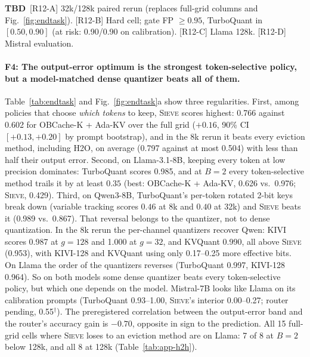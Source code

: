 \documentclass{article}
\newif\ifshowtbd \showtbdtrue
\newcommand{\tbd}[1]{\ifshowtbd{\color{tbdcol}\textbf{TBD}~#1}\else\ifhmode\unskip\fi\fi}
\newcommand{\est}[1]{{\color{estcol}#1$^{\dagger}$}}
\newcommand{\sieve}{\textsc{Sieve}}
\theoremstyle{definition}
\begin{document}
\tbd{[R12-A] 32k/128k paired rerun (replaces full-grid columns and Fig.~\ref{fig:endtask}). [R12-B] Hard cell; gate FP $\ge0.95$, TurboQuant in $[0.50,0.90]$ (at risk: 0.90/0.90 on calibration). [R12-C] Llama 128k. [R12-D] Mistral evaluation.}

\paragraph{F4: The output-error optimum is the strongest token-selective policy, but a model-matched dense quantizer beats all of them.}
Table~\ref{tab:endtask} and Fig.~\ref{fig:endtask}a show three regularities.  First, among policies that choose \emph{which tokens} to keep, \sieve{} scores highest: 0.766 against 0.602 for OBCache-K + Ada-KV over the full grid ($+0.16$, 90\% CI $[+0.13,+0.20]$ by prompt bootstrap), and in the 8k rerun it beats every eviction method, including H2O, on average (0.797 against at most 0.504) with less than half their output error.  Second, on Llama-3.1-8B, keeping every token at low precision dominates: TurboQuant scores 0.985, and at $B=2$ every token-selective method trails it by at least $0.35$ (best: OBCache-K + Ada-KV, 0.626 vs.\ 0.976; \sieve{}, 0.429).  Third, on Qwen3-8B, TurboQuant's per-token rotated 2-bit keys break down (variable tracking scores $0.46$ at 8k and $0.40$ at 32k) and \sieve{} beats it (0.989 vs.\ 0.867).  That reversal belongs to the quantizer, not to dense quantization.  In the 8k rerun the per-channel quantizers recover Qwen: KIVI scores 0.987 at $g{=}128$ and 1.000 at $g{=}32$, and KVQuant 0.990, all above \sieve{} (0.953), with KIVI-128 and KVQuant using only 0.17--0.25 more effective bits.  On Llama the order of the quantizers reverses (TurboQuant 0.997, KIVI-128 0.964).  So on both models some dense quantizer beats every token-selective policy, but which one depends on the model.  Mistral-7B looks like Llama on its calibration prompts (TurboQuant 0.93--1.00, \sieve{}'s interior 0.00--0.27; router pending, \est{0.55}).  The preregistered correlation between the output-error band and the router's accuracy gain is $-0.70$, opposite in sign to the prediction.  All 15 full-grid cells where \sieve{} loses to an eviction method are on Llama: 7 of 8 at $B=2$ below 128k, and all 8 at 128k (Table~\ref{tab:app-h2h}).
\end{document}
